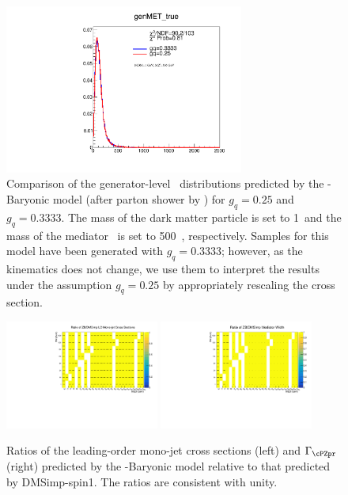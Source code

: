 \begin{figure}[htbp]
   \centering
   \includegraphics[width=0.7\textwidth]{figures/models/gq0p3333_ZpBaryonic_MSC500_MDM1_gq0p25_ZpBaryonic_MSC500_MDM1.pdf}
   \caption{Comparison of the generator-level \MET\ distributions predicted 
by the \cPZpr-Baryonic model (after parton shower by \PYTHIA) for $g_q=0.25$ and $g_q=0.3333$. The mass of 
the dark matter particle is set to 1~\GeV and the mass of the mediator 
\cPZpr\ is set to 500~\GeV, respectively. Samples for this model have been generated with $g_q=0.3333$; however, as the kinematics does not change, we use them to interpret the results under the assumption $g_q=0.25$ by appropriately rescaling the cross section.}
   \label{fig:METZpBgq}
\end{figure}

\begin{figure}[htbp]
   \centering
   \includegraphics[width=0.45\textwidth]{figures/models/xsec_ZBToDMSimp.pdf}
   \includegraphics[width=0.45\textwidth]{figures/models/width_ZBToDMSimp.pdf}
   \caption{Ratios of the leading-order mono-jet cross sections (left) 
and $\Gamma_{\cPZpr}$ (right) predicted by the \cPZpr-Baryonic model 
relative to that 
predicted by {\sc DMSimp-spin1}. The ratios are consistent with unity.
}
   \label{fig:ZBXsWidth}
\end{figure}




